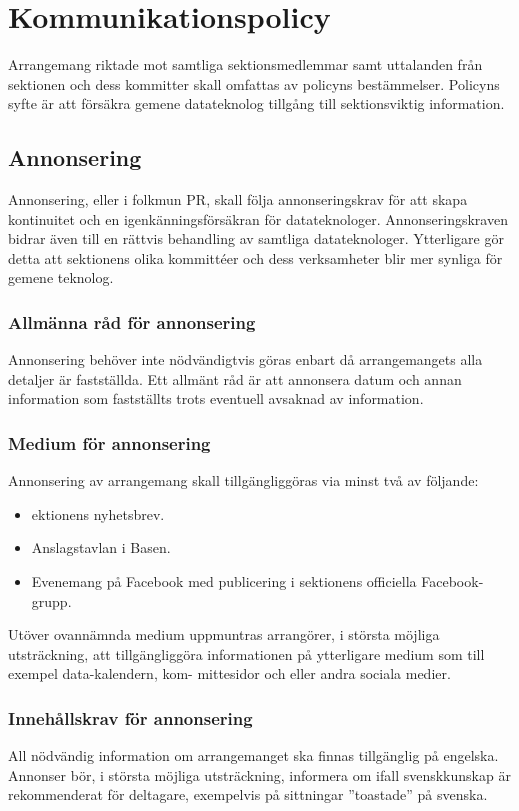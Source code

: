 \section{Kommunikationspolicy}
Arrangemang riktade mot samtliga sektionsmedlemmar samt uttalanden från sektionen och dess kommitter skall omfattas av policyns bestämmelser. Policyns syfte är att försäkra gemene datateknolog tillgång till sektionsviktig information.

\subsection{Annonsering}
Annonsering, eller i folkmun PR, skall följa annonseringskrav för att skapa kontinuitet
och en igenkänningsförsäkran för datateknologer. Annonseringskraven bidrar även till en
rättvis behandling av samtliga datateknologer. Ytterligare gör detta att sektionens olika
kommittéer och dess verksamheter blir mer synliga för gemene teknolog.

\subsubsection{Allmänna råd för annonsering}
Annonsering behöver inte nödvändigtvis göras enbart då arrangemangets alla detaljer är
fastställda. Ett allmänt råd är att annonsera datum och annan information som fastställts
trots eventuell avsaknad av information.

\subsubsection{Medium för annonsering}
Annonsering av arrangemang skall tillgängliggöras via minst två av följande:
\begin{itemize}
    \item ektionens nyhetsbrev.
    \item Anslagstavlan i Basen.
    \item Evenemang på Facebook med publicering i sektionens officiella Facebook-grupp.
\end{itemize}
Utöver ovannämnda medium uppmuntras arrangörer, i största möjliga utsträckning, att
tillgängliggöra informationen på ytterligare medium som till exempel data-kalendern, kom-
mittesidor och eller andra sociala medier.

\subsubsection{Innehållskrav för annonsering}
All nödvändig information om arrangemanget ska finnas tillgänglig på engelska. Annonser
bör, i största möjliga utsträckning, informera om ifall svenskkunskap är rekommenderat
för deltagare, exempelvis på sittningar ”toastade” på svenska.

